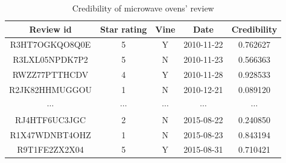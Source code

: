 \documentclass[12pt]{article}%
\begin{document}
\begin{table}[H]
	\centering
	\caption{Credibility of microwave ovens' review}	
	\begin{tabular}{ccccc}
		\toprule[1.5pt]
		\multicolumn{1}{m{3.5cm}}{\centering Review id} & \multicolumn{1}{m{2cm}}{\centering Star rating}&
		\multicolumn{1}{m{1cm}}{\centering Vine}&
		\multicolumn{1}{m{3cm}}{\centering Date}&
		\multicolumn{1}{m{2.5cm}}{\centering \textbf{Credibility}}\\
		\midrule[1pt]
		R3HT7OGKQO8Q0E &5&Y&2010-11-22&0.762627\\
		R3LXL05NPDK7P2 &5&N	&2010-11-23	&0.566363\\
		RWZZ77PTTHCDV &4&Y&2010-11-28&0.928533\\
		R2JK82HHMUGGOU &1&N&2010-12-21&0.089120\\
		$\cdots $&$\cdots $&$\cdots $&$\cdots $&$\cdots $\\
		RJ4HTF6UC3JGC &2&N&2015-08-22&0.240850\\
		R1X47WDNBT4OHZ &1&N&2015-08-23&0.843194\\
		R9T1FE2ZX2X04 &5&Y&2015-08-31&0.710421\\
		\bottomrule[1.6pt]
	\end{tabular}\label{biassssoss}
\end{table}


\end{document}
